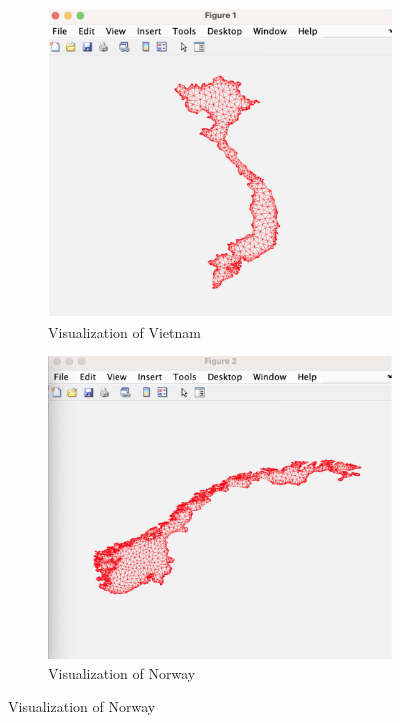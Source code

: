 \documentclass[unicode,11pt,a4paper,oneside,numbers=endperiod,openany]{scrartcl}
\begin{document}
\begin{figure}[htbp]
    \centering
    
    \begin{subfigure}[b]{0.4\textwidth}
        \includegraphics[width=\textwidth]{images/vietnam.png} 
        \caption{Visualization of Vietnam} 
        \label{fig:first}
    \end{subfigure}
    \hfill
    \begin{subfigure}[b]{0.4\textwidth}
        \includegraphics[width=\textwidth]{images/Norway.png} 
        \caption{Visualization of Norway} 
    \end{subfigure}
    
\end{figure}
\end{document}
